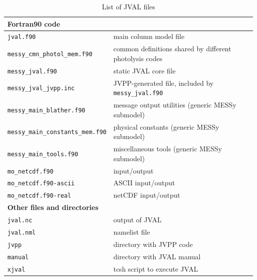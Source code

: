 \documentclass[a4paper,twoside]{article}
\begin{document}
\begin{table}[tbh]
  \begin{center}
    \caption{List of JVAL files}
    \label{tab:files_jval}
    \begin{tabular}{lp{}}
      \hline
      \multicolumn{2}{l}{\bf Fortran90 code}\\
      \hline
      \verb|jval.f90|                      & main column model file\\
      \verb|messy_cmn_photol_mem.f90|      & common definitions shared by different photolysis codes\\
      \verb|messy_jval.f90|                & static JVAL core file\\
      \verb|messy_jval_jvpp.inc|           & JVPP-generated file, included by \verb|messy_jval.f90|\\
      \verb|messy_main_blather.f90|        & message output utilities (generic MESSy submodel)\\
      \verb|messy_main_constants_mem.f90|  & physical constants (generic MESSy submodel)\\
      \verb|messy_main_tools.f90|          & miscellaneous tools (generic MESSy submodel)\\
      \verb|mo_netcdf.f90|                 & input/output\\
      \verb|mo_netcdf.f90-ascii|           & ASCII input/output\\
      \verb|mo_netcdf.f90-real|            & netCDF input/output\\
      \hline
      \multicolumn{2}{l}{\bf Other files and directories}\\
      \hline
      \verb|jval.nc|                       & output of JVAL\\
      \verb|jval.nml|                      & namelist file\\
      \verb|jvpp|                          & directory with JVPP code\\
      \verb|manual|                        & directory with JVAL manual\\
      \verb|xjval|                         & tcsh script to execute JVAL\\
      \hline
    \end{tabular}
  \end{center}
\end{table}
\end{document}
